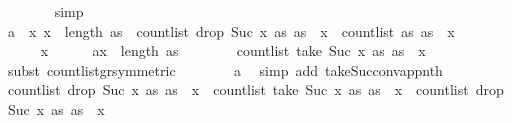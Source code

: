 \begin{isabellebody}
\ \ \ \ \ \ \isamarkupfalse%
\ simp\isanewline
\ \ \isamarkupfalse%
\isanewline
\ \ \isamarkupfalse%
\ a{}{\isacharunderscore}{\kern0pt}{}{\isacharcolon}{\kern0pt}\ {\isachardoublequoteopen}\ {\isasymAnd}x{\isachardot}{\kern0pt}\ x\ {\isacharless}{\kern0pt}\ length\ as\ {\isasymLongrightarrow}\ count{\isacharunderscore}{\kern0pt}list\ {\isacharparenleft}{\kern0pt}drop\ {\isacharparenleft}{\kern0pt}Suc\ x{\isacharparenright}{\kern0pt}\ as{\isacharparenright}{\kern0pt}\ {\isacharparenleft}{\kern0pt}as\ {\isacharbang}{\kern0pt}\ x{\isacharparenright}{\kern0pt}\ {\isacharless}{\kern0pt}\ count{\isacharunderscore}{\kern0pt}list\ as\ {\isacharparenleft}{\kern0pt}as\ {\isacharbang}{\kern0pt}\ x{\isacharparenright}{\kern0pt}{\isachardoublequoteclose}\isanewline
\ \ \isamarkupfalse%
\ {\isacharminus}{\kern0pt}\isanewline
\ \ \ \ \isamarkupfalse%
\ x\isanewline
\ \ \ \ \isamarkupfalse%
\ a{\isacharcolon}{\kern0pt}{\isachardoublequoteopen}x\ {\isacharless}{\kern0pt}\ length\ as{\isachardoublequoteclose}\isanewline
\ \ \ \ \isamarkupfalse%
\ {\isachardoublequoteopen}{}\ {\isasymle}\ count{\isacharunderscore}{\kern0pt}list\ {\isacharparenleft}{\kern0pt}take\ {\isacharparenleft}{\kern0pt}Suc\ x{\isacharparenright}{\kern0pt}\ as{\isacharparenright}{\kern0pt}\ {\isacharparenleft}{\kern0pt}as\ {\isacharbang}{\kern0pt}\ x{\isacharparenright}{\kern0pt}{\isachardoublequoteclose}\isanewline
\ \ \ \ \ \ \isamarkupfalse%
\ {\isacharparenleft}{\kern0pt}subst\ count{\isacharunderscore}{\kern0pt}list{\isacharunderscore}{\kern0pt}gr{\isacharunderscore}{\kern0pt}{}{\isacharbrackleft}{\kern0pt}symmetric{\isacharbrackright}{\kern0pt}{\isacharparenright}{\kern0pt}\isanewline
\ \ \ \ \ \ \isamarkupfalse%
\ a\ \isamarkupfalse%
\ {\isacharparenleft}{\kern0pt}simp\ add{\isacharcolon}{\kern0pt}\ take{\isacharunderscore}{\kern0pt}Suc{\isacharunderscore}{\kern0pt}conv{\isacharunderscore}{\kern0pt}app{\isacharunderscore}{\kern0pt}nth{\isacharparenright}{\kern0pt}\isanewline
\ \ \ \ \isamarkupfalse%
\ {\isachardoublequoteopen}count{\isacharunderscore}{\kern0pt}list\ {\isacharparenleft}{\kern0pt}drop\ {\isacharparenleft}{\kern0pt}Suc\ x{\isacharparenright}{\kern0pt}\ as{\isacharparenright}{\kern0pt}\ {\isacharparenleft}{\kern0pt}as\ {\isacharbang}{\kern0pt}\ x{\isacharparenright}{\kern0pt}\ {\isacharless}{\kern0pt}\ count{\isacharunderscore}{\kern0pt}list\ {\isacharparenleft}{\kern0pt}take\ {\isacharparenleft}{\kern0pt}Suc\ x{\isacharparenright}{\kern0pt}\ as{\isacharparenright}{\kern0pt}\ {\isacharparenleft}{\kern0pt}as\ {\isacharbang}{\kern0pt}\ x{\isacharparenright}{\kern0pt}\ {\isacharplus}{\kern0pt}\ count{\isacharunderscore}{\kern0pt}list\ {\isacharparenleft}{\kern0pt}drop\ {\isacharparenleft}{\kern0pt}Suc\ x{\isacharparenright}{\kern0pt}\ as{\isacharparenright}{\kern0pt}\ {\isacharparenleft}{\kern0pt}as\ {\isacharbang}{\kern0pt}\ x{\isacharparenright}{\kern0pt}{\isachardoublequoteclose}\isanewline

\end{isabellebody}
